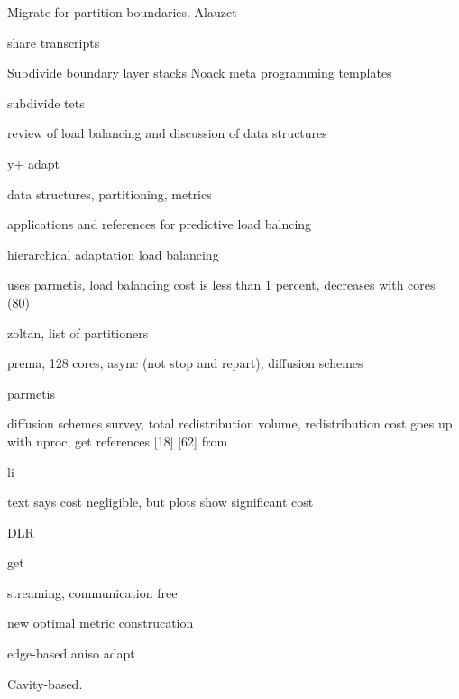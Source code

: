 \documentclass{article}
\begin{document}
Migrate for partition boundaries. 
Alauzet\cite{alauzet-li-seol-shephard-para-aniso}
\cite{kallinderis-load-balance}
\cite{lepage-parallel-adapt}
\cite{cavallo-para-adapt}
\cite{cavallo-phd-thesis}

share transcripts
\cite{park-darmofal-parallel-aniso-adapt-aiaa}
\cite{park-phd-thesis}

Subdivide boundary layer stacks
\cite{rpi-ec-2008-adapt-bl-visc}
\cite{kallinderis-adapt}
\cite{mavriplis-3d-adapt-mixed-subdivision}
\cite{lapage-habashi-3d-aniso-2002}
\cite{cavallo-phd-thesis}
\cite{kim-nakahashi-adjoint-adapt-viscous}
Noack meta programming templates\cite{noack-unstruct-mixed-adapt-template}

subdivide tets
\cite{rausch-unsteady-adaptation-3d}
\cite{waltz:2003}

review of load balancing and discussion of data structures
\cite{kallinderis-kavouklis-adapt-3d-hybrid,%
      kavouklis-kallinderis-parallel-3d-hybrid-adapt}

y+ adapt\cite{knopp-alrutz-schwambor-adapt-grid-wall-func-rans}

data structures, partitioning, metrics
\cite{flaherty-parallel-data-structures,teresco-phd-thesis-para-adapt-part-load-balancing}

applications and references for predictive load balncing
\cite{dindar-shephard-flaherty-adapt-rotorcraft-tc-rotor}

hierarchical adaptation\cite{kallinderis-parallel}
load balancing\cite{minyard-kallinderis-load-balance}

uses parmetis, load balancing cost is less than 1 percent, decreases with cores (80)
\cite{eccomas-2010-para-perf-adapt}

zoltan, list of partitioners
\cite{devine-anm-2005-zoltan-load-balancing}

prema, 128 cores, async (not stop and repart), diffusion schemes
\cite{chrisochoides-ieee-tpds-2004-load-balance}

parmetis
\cite{parmetis-sc-2000}

diffusion schemes survey, total redistribution volume, redistribution cost goes up with nproc,
get references [18] [62] from
\cite{oliker-thesis}

li
\cite{li-masters-thesis,li-load-balance}

text says cost negligible, but plots show significant cost
\cite{park-para-unsteady-adapt}

DLR\cite{tau-para-adapt-hybrid-eccomas}

get
\cite{selwood}

streaming, communication free\cite{pebay-parallel-adapt}


new optimal metric construcation
\cite{yano-darmofal-opt-framework-simplex-adapt}

edge-based aniso adapt
\cite{michal-krakos-aniso-adapt-edge}
\cite{loseille-lohner-imr18-3d-aniso-adapt-surf-vol-bl}

Cavity-based.\cite{loseille-lohner-cavity-based-op}




\end{document}
